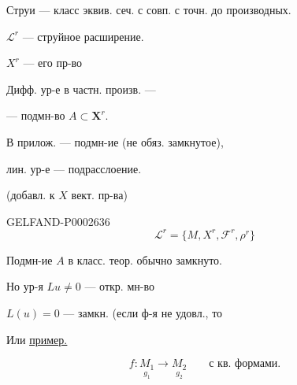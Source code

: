 Струи --- класс эквив. сеч. с совп. с точн. до производных.





$\mathcal L^r$ --- струйное расширение.

\hspace*{55mm}$X^r$ --- его пр-во





Дифф. ур-е в частн. произв. ---

--- подмн-во $A\subset\boldsymbol X^r$.





В прилож. --- подмн-ие (не обяз. замкнутое),





лин. ур-е --- подрасслоение.

(добавл. к $X$ вект. пр-ва)





\begin{GelfandAdjacentEvidence}{GELFAND-P000263}{6}
\begin{equation*}
\mathcal L^r=\{M,X^r,\mathcal F^r,\rho^r\}
\end{equation*}

\end{GelfandAdjacentEvidence}


Подмн-ие $A$ в класс. теор. обычно замкнуто.





Но ур-я $Lu\ne0$ --- откр. мн-во





$L(u)=0$ --- замкн. (если ф-я не удовл., то







Или \underline{\underline{пример.}}





\begin{equation*}
f:\underset{g_1}{M_1}\longrightarrow\underset{g_2}{M_2}\qquad\text{с кв. формами.}
\end{equation*}





